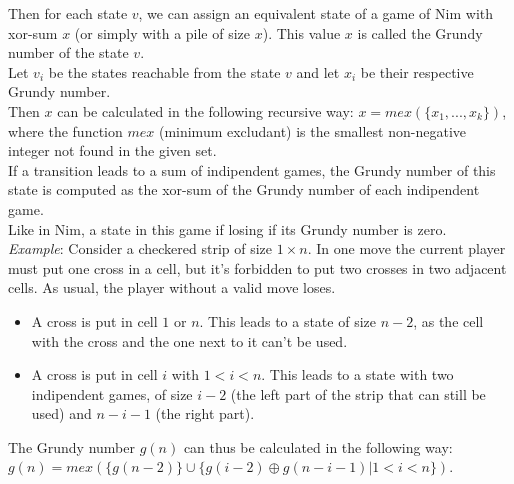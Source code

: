 \documentclass[9pt]{extarticle}
\begin{document}
\begin{multicols*}{3}
Then for each state $v$, we can assign an equivalent state of a game of Nim with xor-sum $x$
(or simply with a pile of size $x$). This value $x$ is called the Grundy number of the state $v$. \\
Let $v_i$ be the states reachable from the state $v$ and let $x_i$ be their respective Grundy number. \\
Then $x$ can be calculated in the following recursive way: $x = mex(\{x_1, ..., x_k\})$,
where the function $mex$ (minimum excludant) is the smallest non-negative integer not found in the given set. \\
If a transition leads to a sum of indipendent games, the Grundy number of this state is computed as the
xor-sum of the Grundy number of each indipendent game. \\
Like in Nim, a state in this game if losing if its Grundy number is zero. \\
\textit{Example}: Consider a checkered strip of size $1 \times n$. In one move the current player must put one cross in
a cell, but it's forbidden to put two crosses in two adjacent cells. As usual, the player without a valid move loses.
\begin{itemize}
\item A cross is put in cell $1$ or $n$. This leads to a state of size $n - 2$,
as the cell with the cross and the one next to it can't be used.
\item A cross is put in cell $i$ with $1 < i < n$. This leads to a state with two indipendent games,
of size $i - 2$ (the left part of the strip that can still be used) and $n - i - 1$ (the right part).
\end{itemize}
The Grundy number $g(n)$ can thus be calculated in the following way:
$g(n) = mex(\{g(n - 2)\} \cup \{g(i - 2) \oplus g(n - i - 1) | 1 < i < n\})$.


\end{multicols*}
\end{document}
